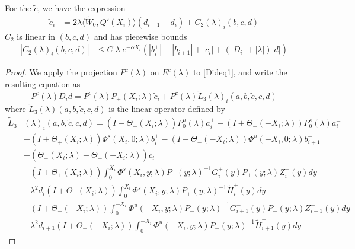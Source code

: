 \documentclass[thesis.tex]{subfiles}
\begin{document}
\begin{lemma}\label{lemma:tildec1}
For the $\tilde{c}$, we have the expression
\begin{align}\label{tildeciexp1}
\tilde{c}_i &= 2 \lambda \langle \tilde{W}_0, Q'(X_i) \rangle (d_{i+1} - d_i ) + C_2(\lambda)_i(b, c, d)
\end{align}
$C_2$ is linear in $(b, c, d)$ and has piecewise bounds
\begin{align}
|C_2(\lambda)_i(b, c, d)| &\leq C |\lambda| e^{-\alpha X_i} \left( |b_i^+| + |b_{i+1}^-| + |c_i| + (|D_i| + |\lambda|)|d| \right) \label{C2bound}
\end{align}
\begin{proof}
We apply the projection $P^c(\lambda)$ on $E^c(
\lambda)$ to \eqref{Dideq1}, and write the resulting equation as
\begin{equation}\label{PcDid}
P^c(\lambda)D_i d = P^c(\lambda) P_+(X_i; \lambda)\tilde{c}_i + P^c(\lambda) \tilde{L}_3(
\lambda)_i(a,b,\tilde{c},c,d)
\end{equation}
where $\tilde{L}_3(\lambda)(a,b,\tilde{c},c,d)$ is the linear operator defined by
\begin{align*}
\tilde{L}_3&(\lambda)_i(a,b,\tilde{c},c,d) = (I + \Theta_+(X_i; \lambda))P_0^u(\lambda) a_i^+ - (I + \Theta_-(-X_i; \lambda))P_0^s(\lambda)a_i^- \\
&+ (I + \Theta_+(X_i; \lambda))\Phi^s(X_i, 0; \lambda) b_i^+ - (I + \Theta_-(-X_i; \lambda))\Phi^u(-X_i, 0; \lambda) b_{i+1}^- \\
&+ (\Theta_+(X_i; \lambda) - \Theta_-(-X_i; \lambda))c_i  \\
&+ (I + \Theta_+(X_i; \lambda)) \int_0^{X_i} \Phi^s(X_i, y; \lambda) P_+(y; \lambda)^{-1} G_i^+(y) P_+(y; \lambda) Z_i^+(y) dy \\
&+ \lambda^2 d_i (I + \Theta_+(X_i; \lambda))  \int_0^{X_i} \Phi^s(X_i, y; \lambda) P_+(y; \lambda)^{-1} \tilde{H}_i^+(y) dy \\ 
&- (I + \Theta_-(-X_i; \lambda)) \int_0^{-X_i} \Phi^u(-X_i, y; \lambda) P_-(y; \lambda)^{-1} G_{i+1}^-(y) P_-(y; \lambda)Z_{i+1}^-(y) dy \\
&- \lambda^2 d_{i+1} (I + \Theta_-(-X_i; \lambda)) \int_0^{-X_i} \Phi^u(-X_i, y; \lambda) P_-(y; \lambda)^{-1} \tilde{H}_{i+1}^-(y) dy
\end{align*}


\end{proof}
\end{lemma}
\end{document}
